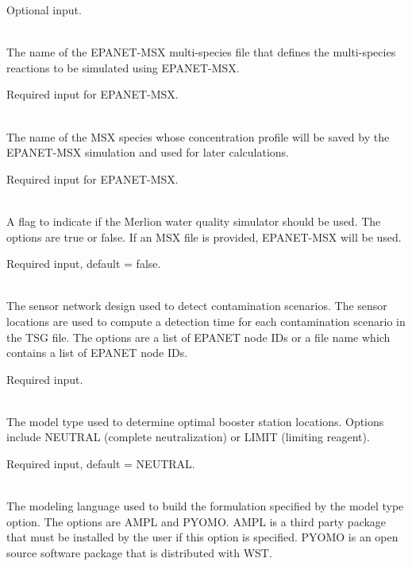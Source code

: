 \begin{description}[topsep=0pt,parsep=0.5em,itemsep=-0.4em]
\begin{description}[topsep=0pt,parsep=0.5em,itemsep=-0.4em]
                Optional input.
    \item[{msx file}]\hfill
\\The name of the EPANET-MSX multi-species file that defines the multi-species reactions to
                be simulated using EPANET-MSX.
                
                Required input for EPANET-MSX.
    \item[{msx species}]\hfill
\\The name of the MSX species whose concentration profile will be saved by the EPANET-MSX simulation
                and used for later calculations.
                
                Required input for EPANET-MSX.
    \item[{merlion}]\hfill
\\A flag to indicate if the Merlion water quality
                simulator should be used. The options are true or false. 
                If an MSX file is provided, EPANET-MSX will be used.
                
                Required input, default = false.
  \end{description}
  \item[{booster mip}]\hfill
  \begin{description}[topsep=0pt,parsep=0.5em,itemsep=-0.4em]
    \item[{detection}]\hfill
\\The sensor network design used to detect contamination scenarios. The
                sensor locations are used to compute a detection time for each 
                contamination scenario in the TSG file. The options are a list of 
                EPANET node IDs or a file name which contains a list of EPANET node IDs.
                
                Required input.
    \item[{model type}]\hfill
\\The model type used to determine optimal booster station
                locations. Options include NEUTRAL (complete neutralization)
                or LIMIT (limiting reagent). 
                
                Required input, default = NEUTRAL.
    \item[{model format}]\hfill
\\The modeling language used to build the formulation specified
                by the model type option. The options are AMPL and PYOMO. 
				AMPL is a third party package that must be installed by 
				the user if this option is specified. PYOMO is an open source 
				software package that is distributed with WST. 
                

\end{description}
\end{description}
